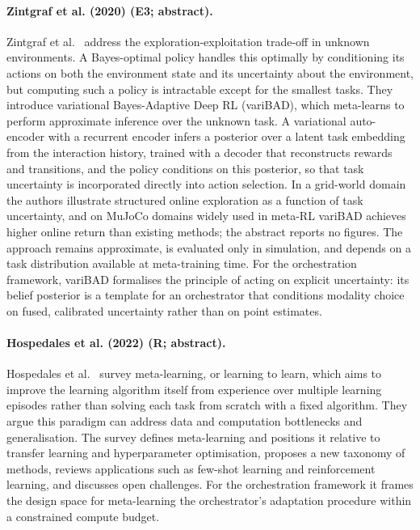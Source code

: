 \documentclass[10pt,a4paper]{article}
\begin{document}
\paragraph{Zintgraf et al. (2020) (E3; abstract).} Zintgraf et al.~\cite{Zintgraf2020} address the exploration-exploitation trade-off in unknown environments. A Bayes-optimal policy handles this optimally by conditioning its actions on both the environment state and its uncertainty about the environment, but computing such a policy is intractable except for the smallest tasks. They introduce variational Bayes-Adaptive Deep RL (variBAD), which meta-learns to perform approximate inference over the unknown task. A variational auto-encoder with a recurrent encoder infers a posterior over a latent task embedding from the interaction history, trained with a decoder that reconstructs rewards and transitions, and the policy conditions on this posterior, so that task uncertainty is incorporated directly into action selection. In a grid-world domain the authors illustrate structured online exploration as a function of task uncertainty, and on MuJoCo domains widely used in meta-RL variBAD achieves higher online return than existing methods; the abstract reports no figures. The approach remains approximate, is evaluated only in simulation, and depends on a task distribution available at meta-training time. For the orchestration framework, variBAD formalises the principle of acting on explicit uncertainty: its belief posterior is a template for an orchestrator that conditions modality choice on fused, calibrated uncertainty rather than on point estimates.

\paragraph{Hospedales et al. (2022) (R; abstract).} Hospedales et al.~\cite{Hospedales2022} survey meta-learning, or learning to learn, which aims to improve the learning algorithm itself from experience over multiple learning episodes rather than solving each task from scratch with a fixed algorithm. They argue this paradigm can address data and computation bottlenecks and generalisation. The survey defines meta-learning and positions it relative to transfer learning and hyperparameter optimisation, proposes a new taxonomy of methods, reviews applications such as few-shot learning and reinforcement learning, and discusses open challenges. For the orchestration framework it frames the design space for meta-learning the orchestrator's adaptation procedure within a constrained compute budget.
\end{document}
